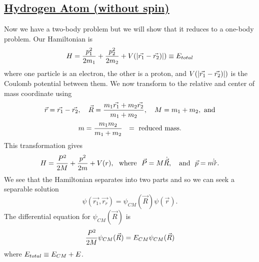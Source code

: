 \subsection{\underline{Hydrogen Atom (without spin)}}
Now we have a two-body problem but we will show that it reduces to a one-body problem. Our Hamiltonian is 
\[ H = {p_1^2\over2m_1} + {p_2^2\over2m_2} + V(|\vec{r_1} - \vec{r_2})|) \equiv E_{total} \] where one particle is an electron, the other is a proton, and
$\displaystyle V(|\vec{r_1} - \vec{r_2})|)$ is the Coulomb potential between them. We now transform to the relative and center of mass coordinate using 
\[ \vec{r} = \vec{r_1} - \vec{r_2}, \quad \vec{R} = {m_1 \vec{r_1} + m_2\vec{r_2}\over m_1 + m_2}, \quad M = m_1 + m_2, \mbox{  and} \]
\[ m = {m_1m_2\over m_1 + m_2} ~~= \mbox{  reduced mass}.\]
This transformation gives 
\[ H = {P^2\over2M} + {p^2\over2m} + V(r), \mbox{~~where~~} \vec{P} = M\dot{\vec{R}}, \mbox{ ~ and ~} \vec{p} = m{\dot\vec{r}}. \]
We see that the Hamiltonian separates into two parts and so we can seek a separable solution 
$$\psi(\vec{r_1},\vec{r_r}) = \psi_{CM}(\vec{R}) \psi(\vec{r}).$$ 
The differential equation for $\psi_{CM}(\vec{R})$ is
$${P^2\over2M} \psi_{CM}(\vec{R}) = E_{CM} \psi_{CM}(\vec{R})$$ where $\displaystyle E_{total} \equiv E_{CM} + E$.




